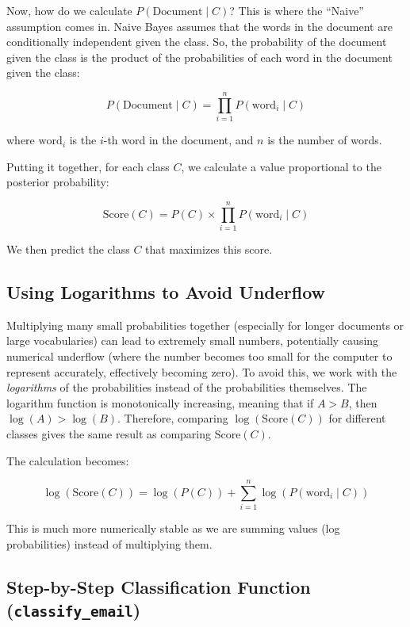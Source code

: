 \documentclass[12pt,letterpaper]{article}
\begin{document}
Now, how do we calculate $P(\text{Document} \mid C)$? This is where the ``Naive'' assumption comes in. Naive Bayes assumes that the words in the document are conditionally independent given the class. So, the probability of the document given the class is the product of the probabilities of each word in the document given the class:

\begin{equation}
P(\text{Document} \mid C) = \prod_{i=1}^{n} P(\text{word}_i \mid C)
\end{equation}

where $\text{word}_i$ is the $i$-th word in the document, and $n$ is the number of words.

Putting it together, for each class $C$, we calculate a value proportional to the posterior probability:

\begin{equation}
\text{Score}(C) = P(C) \times \prod_{i=1}^{n} P(\text{word}_i \mid C)
\end{equation}

We then predict the class $C$ that maximizes this score.

\subsection{Using Logarithms to Avoid Underflow}

Multiplying many small probabilities together (especially for longer documents or large vocabularies) can lead to extremely small numbers, potentially causing numerical underflow (where the number becomes too small for the computer to represent accurately, effectively becoming zero). To avoid this, we work with the \textit{logarithms} of the probabilities instead of the probabilities themselves. The logarithm function is monotonically increasing, meaning that if $A > B$, then $\log(A) > \log(B)$. Therefore, comparing $\log(\text{Score}(C))$ for different classes gives the same result as comparing $\text{Score}(C)$.

The calculation becomes:

\begin{equation}
\log(\text{Score}(C)) = \log(P(C)) + \sum_{i=1}^{n} \log(P(\text{word}_i \mid C))
\end{equation}

This is much more numerically stable as we are summing values (log probabilities) instead of multiplying them.

\subsection{Step-by-Step Classification Function (\texttt{classify\_email})}
\end{document}

